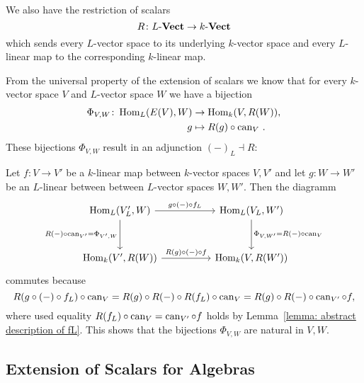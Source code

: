 \begin{remark}
  \label{remark: adjointness of extension and restriction}
  We also have the restriction of scalars
  \[
            R
    \colon  L\text{-}\mathbf{Vect}
    \to     k\text{-}\mathbf{Vect}
  \]
  which sends every $L$-vector space to its underlying $k$-vector space and every $L$-linear map to the corresponding $k$-linear map.
    
  From the universal property of the extension of scalars we know that for every $k$-vector space $V$ and $L$-vector space $W$ we have a bijection
  \begin{align*}
              \Phi_{V,W}
     \colon   \operatorname{Hom}_L(E(V),W)
    &\to      \operatorname{Hom}_k(V,R(W)), \\
              g
    &\mapsto  R(g) \circ \operatorname{can}_V \,.
  \end{align*}
  These bijections $\Phi_{V,W}$ result in an adjunction $(-)_L \dashv R$:
  
  Let $f \colon V \to V'$ be a $k$-linear map between $k$-vector spaces $V, V'$ and let $g \colon W \to W'$ be an $L$-linear between between $L$-vector spaces $W, W'$.
  Then the diagramm
  \[
    \begin{tikzcd}[row sep = 3em, column sep = 5em]
        \Hom_L(V'_L, W)
        \arrow{r}[above]{g \circ (-) \circ f_L}
        \arrow{d}[left]{R(-) \circ \can_{V'} = \Phi_{V',W}}
      & \Hom_L(V_L, W')
        \arrow{d}[right]{\Phi_{V,W'} = R(-) \circ \can_V}
      \\
        \Hom_k(V', R(W))
        \arrow{r}[above]{R(g) \circ (-) \circ f}
      & \Hom_k(V, R(W'))
    \end{tikzcd}
  \]
  commutes because
  \[
      R(g \circ (-) \circ f_L) \circ \operatorname{can}_V
    = R(g) \circ R(-) \circ R(f_L) \circ \operatorname{can}_V
    = R(g) \circ R(-) \circ \operatorname{can}_{V'} \circ f,
  \]
  where used equality $R(f_L) \circ \operatorname{can}_V = \operatorname{can}_{V'} \circ f$ holds by Lemma~\ref{lemma: abstract description of fL}.
  This shows that the bijections $\Phi_{V,W}$ are natural in $V, W$.
\end{remark}





\subsection{Extension of Scalars for Algebras}

